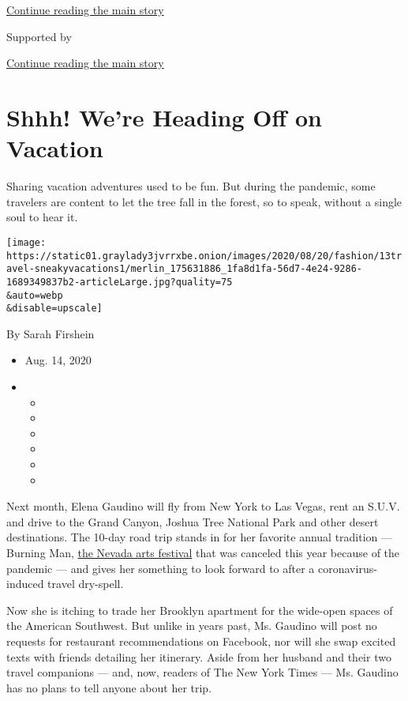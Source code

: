 \protect\hyperlink{after-top}{Continue reading the main story}

Supported by

\protect\hyperlink{after-sponsor}{Continue reading the main story}

\hypertarget{shhh-were-heading-off-on-vacation}{%
\section{Shhh! We're Heading Off on
Vacation}\label{shhh-were-heading-off-on-vacation}}

Sharing vacation adventures used to be fun. But during the pandemic,
some travelers are content to let the tree fall in the forest, so to
speak, without a single soul to hear it.

\texttt{[image: https://static01.graylady3jvrrxbe.onion/images/2020/08/20/fashion/13travel-sneakyvacations1/merlin\_175631886\_1fa8d1fa-56d7-4e24-9286-1689349837b2-articleLarge.jpg?quality=75\\\&auto=webp\\\&disable=upscale]}

By Sarah Firshein

\begin{itemize}
\item
  Aug. 14, 2020
\item
  \begin{itemize}
  \item
  \item
  \item
  \item
  \item
  \item
  \end{itemize}
\end{itemize}

Next month, Elena Gaudino will fly from New York to Las Vegas, rent an
S.U.V. and drive to the Grand Canyon, Joshua Tree National Park and
other desert destinations. The 10-day road trip stands in for her
favorite annual tradition --- Burning Man,
\href{https://www.nytimes3xbfgragh.onion/2020/04/11/arts/music/burning-man-canceled-coronavirus.html}{the
Nevada arts festival} that was canceled this year because of the
pandemic --- and gives her something to look forward to after a
coronavirus-induced travel dry-spell.

Now she is itching to trade her Brooklyn apartment for the wide-open
spaces of the American Southwest. But unlike in years past, Ms. Gaudino
will post no requests for restaurant recommendations on Facebook, nor
will she swap excited texts with friends detailing her itinerary. Aside
from her husband and their two travel companions --- and, now, readers
of The New York Times --- Ms. Gaudino has no plans to tell anyone about
her trip.

